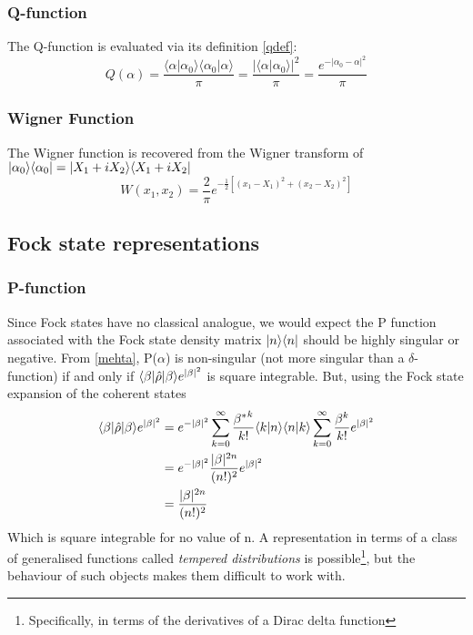 \subsubsection{Q-function}
The Q-function is evaluated via its definition \ref{qdef}:
\begin{equation}
	Q(\alpha) = \frac{\langle \alpha | \alpha_0 \rangle \langle \alpha_0 | \alpha \rangle}{\pi} = \frac{{|\langle \alpha | \alpha_0 \rangle |}^2}{\pi} =  \frac{e^{-{|\alpha_0 - \alpha |}^2}}{\pi}
\end{equation}
\subsubsection{Wigner Function}
The Wigner function is recovered from the Wigner transform of $| \alpha_0 \rangle\langle \alpha_0 | = | X_1+iX_2 \rangle\langle X_1+iX_2 |$
\begin{equation}
	W(x_1, x_2) = \frac{2}{ \pi} e^{-\frac{1}{2}[(x_1-X_1)^2+(x_2-X_2)^2]}
\end{equation}
\subsection{Fock state representations}
\subsubsection{P-function}

Since Fock states have no classical analogue, we would expect the P function associated with the Fock state density matrix $| n \rangle\langle n |$ should be highly singular or negative. From \ref{mehta}, P($\alpha$) is non-singular (not more singular than a $\delta$-function) if and only if $ \langle \beta | \hat{\rho} | \beta \rangle e^{|\beta|^2} $ is square integrable. But, using the Fock state expansion of the coherent states
\begin{align}
	 \langle \beta | \hat{\rho} | \beta \rangle e^{|\beta|^2}  &= e^{-|\beta|^2} \sum_{k=0}^\infty \frac {{\beta^*}^k}{k!} \langle k | n \rangle\langle n | k \rangle \sum_{k=0}^\infty \frac {\beta^k}{k!}e^{|\beta|^2} \\ &= e^{-|\beta|^2} \frac{|\beta|^{2n}}{(n!)^2} e^{|\beta|^2} \\ &= \frac{|\beta|^{2n}}{(n!)^2}
\end{align}
Which is square integrable for no value of n.
A representation in terms of a class of generalised functions called \emph{tempered distributions} is possible\footnote{Specifically, in terms of the derivatives of a Dirac delta function\autocite{Gerry2005}}, but the behaviour of such objects makes them difficult to work with.
